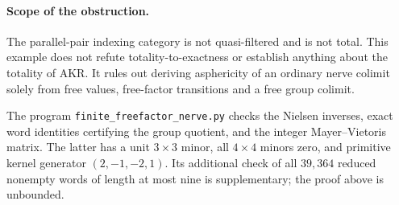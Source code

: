 \paragraph{Scope of the obstruction.}
The parallel-pair indexing category is not quasi-filtered and is not
total. This example does not refute totality-to-exactness or establish
anything about the totality of AKR. It rules out deriving asphericity
of an ordinary nerve colimit solely from free values, free-factor
transitions and a free group colimit.

The program \texttt{finite\_freefactor\_nerve.py} checks the Nielsen
inverses, exact word identities certifying the group quotient, and the
integer Mayer--Vietoris matrix. The latter has a unit $3\times3$ minor,
all $4\times4$ minors zero, and primitive kernel generator
$(2,-1,-2,1)$. Its additional check of all $39{,}364$ reduced nonempty
words of length at most nine is supplementary; the proof above is
unbounded.
